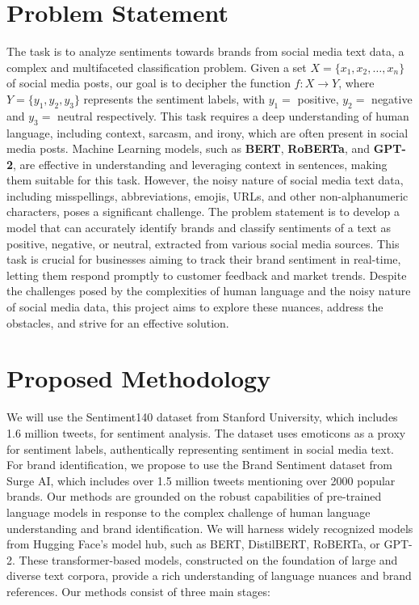 \documentclass{article}
\begin{document}
\section{Problem Statement}

The task is to analyze sentiments towards brands from social media text data, a
complex and multifaceted classification problem. Given a set $X = \{x_1, x_2,
    \ldots, x_n\}$ of social media posts, our goal is to decipher the function $f:
    X \rightarrow Y$, where $Y = \{y_1, y_2, y_3\}$ represents the sentiment
labels, with $y_1 =$ positive, $y_2 =$ negative and $y_3 =$ neutral
respectively. This task requires a deep understanding of human language,
including context, sarcasm, and irony, which are often present in social media
posts. Machine Learning models, such as \textbf{BERT}, \textbf{RoBERTa}, and
\textbf{GPT-2}, are effective in understanding and leveraging context in
sentences, making them suitable for this task. However, the noisy nature of
social media text data, including misspellings, abbreviations, emojis, URLs,
and other non-alphanumeric characters, poses a significant challenge. The
problem statement is to develop a model that can accurately identify brands and
classify sentiments of a text as positive, negative, or neutral, extracted from
various social media sources. This task is crucial for businesses aiming to
track their brand sentiment in real-time, letting them respond promptly to
customer feedback and market trends. Despite the challenges posed by the
complexities of human language and the noisy nature of social media data, this
project aims to explore these nuances, address the obstacles, and strive for an
effective solution.

\section{Proposed Methodology}

We will use the Sentiment140 dataset from Stanford University, which includes
1.6 million tweets, for sentiment analysis. The dataset uses emoticons as a
proxy for sentiment labels, authentically representing sentiment in social
media text. For brand identification, we propose to use the Brand Sentiment
dataset from Surge AI, which includes over 1.5 million tweets mentioning over
2000 popular brands. Our methods are grounded on the robust capabilities of
pre-trained language models in response to the complex challenge of human
language understanding and brand identification. We will harness widely
recognized models from Hugging Face's model hub, such as BERT, DistilBERT,
RoBERTa, or GPT-2. These transformer-based models, constructed on the
foundation of large and diverse text corpora, provide a rich understanding of
language nuances and brand references. Our methods consist of three main
stages:
\end{document}
